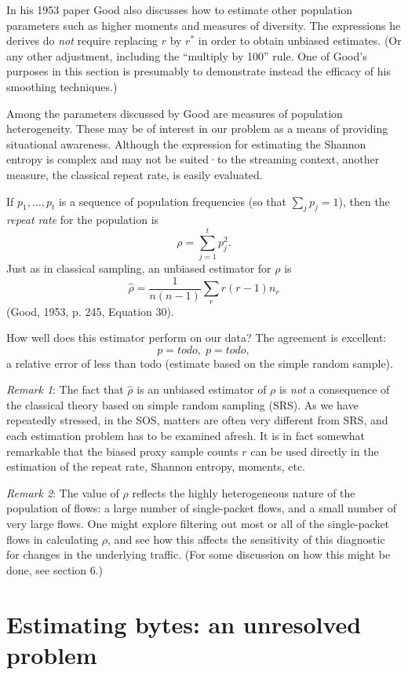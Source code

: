 \documentclass{paper}
\begin{document}
In his 1953 paper Good also discusses how to estimate other population
parameters such as higher moments and measures of diversity. The expressions he
derives do \emph{not} require replacing $r$ by $r^*$ in order to obtain unbiased estimates.
(Or any other adjustment, including the ``multiply by 100'' rule. One of Good's
purposes in this section is presumably to demonstrate instead the efficacy of
his smoothing techniques.)

Among the parameters discussed by Good are measures of population
heterogeneity. These may be of interest in our problem as a means of providing
situational awareness. Although the expression for estimating the Shannon
entropy is complex and may not be suited·to the streaming context, another
measure, the classical repeat rate, is easily evaluated.

If $p_1, \dots, p_t$ is a sequence of population frequencies (so that $\sum_j
p_j = 1$), then the \emph{repeat rate} for the population is
$$ \rho = \sum_{j=1}^t p_j^2. $$
Just as in classical sampling, an unbiased estimator for $\rho$ is
$$ \hat{\rho} = \frac{1}{n(n-1)} \sum_r r(r-1)n_r $$
(Good, 1953, p. 245, Equation 30).

How well does this estimator perform on our data? The agreement is
excellent:
$$ p = todo,\;p= todo, $$
a relative error of less than todo (estimate based on the simple random
sample).

\emph{Remark 1}: The fact that $\hat{\rho}$ is an unbiased estimator of $\rho$
is \emph{not} a consequence of the classical theory based on simple random
sampling (SRS). As we have repeatedly stressed, in the SOS, matters are often
very different from SRS, and each estimation problem has to be examined afresh.
It is in fact somewhat remarkable that the biased proxy sample counts $r$ can
be used directly in the estimation of the repeat rate, Shannon entropy,
moments, etc.

\emph{Remark 2}: The value of $\rho$ reflects the highly heterogeneous nature
of the population of flows: a large number of single-packet flows, and a small
number of very large flows. One might explore filtering out most or all of the
single-packet flows in calculating $\rho$, and see how this affects the
sensitivity of this diagnostic for changes in the underlying traffic. (For some
discussion on how this might be done, see section 6.)

\section{Estimating bytes: an unresolved problem}
\end{document}
